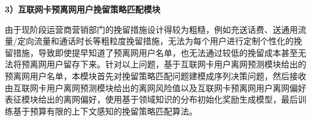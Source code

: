\textbf{3）互联网卡预离网用户挽留策略匹配模块}\par
由于现阶段运营商营销部门的挽留措施设计得较为粗糙，例如充送话费、送通用流量/定向流量和通话时长等粗粒度挽留措施，无法为每个用户进行定制个性化的挽留措施，导致即使提早知道了预离网用户名单，也无法通过较低的挽留成本甚至无法将预离网用户留存下来。针对以上问题，基于互联网卡用户离网预测模块给出的预离网用户名单，本模块首先对挽留策略匹配问题建模成序列决策问题，然后接收由互联网卡用户离网预测模块给出的离网风险值以及互联网卡预离网用户离网偏好表征模块给出的离网偏好，使用基于领域知识的分布初始化奖励生成模型，最后训练基于预算有限的上下文感知的挽留策略匹配算法。

